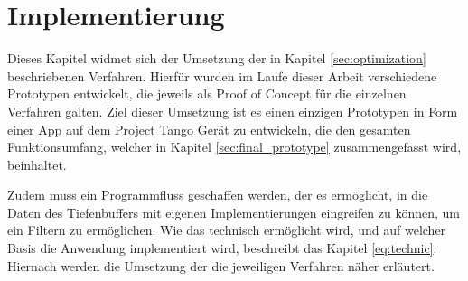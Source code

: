 \chapter{Implementierung} \label{sec:implementation}

Dieses Kapitel widmet sich der Umsetzung der in Kapitel \ref{sec:optimization} beschriebenen Verfahren. Hierfür wurden im Laufe dieser Arbeit verschiedene Prototypen entwickelt, die jeweils als Proof of Concept für die einzelnen Verfahren galten. Ziel dieser Umsetzung ist es einen einzigen Prototypen in Form einer App auf dem Project Tango Gerät zu entwickeln, die den gesamten Funktionsumfang, welcher in Kapitel \ref{sec:final_prototype} zusammengefasst wird, beinhaltet. 

Zudem muss ein Programmfluss geschaffen werden, der es ermöglicht, in die Daten des Tiefenbuffers mit eigenen Implementierungen eingreifen zu können, um ein Filtern zu ermöglichen. Wie das technisch ermöglicht wird, und auf welcher Basis die Anwendung implementiert wird, beschreibt das Kapitel \ref{eq:technic}. Hiernach werden die Umsetzung der die jeweiligen Verfahren näher erläutert.










